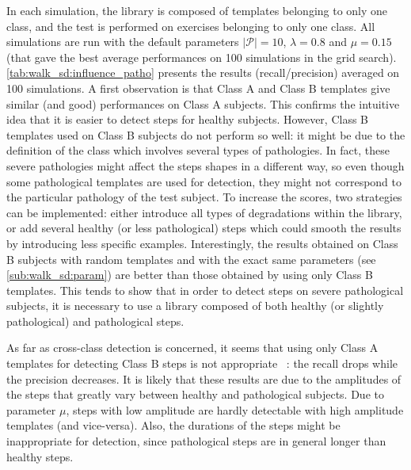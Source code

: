 \documentclass[../thesis.tex]{subfiles}
\begin{document}
In each simulation, the library is composed of templates belonging to only one class, and the test is performed on exercises belonging to only one class. All simulations are run with the default parameters  $|\mathcal{P}|=10$, $\lambda=0.8$ and $\mu=0.15$ (that gave the best average performances on 100 simulations in the grid search).  \autoref{tab:walk_sd:influence_patho} presents the results (recall/precision) averaged on 100 simulations.
A first observation is that Class A and Class B templates give similar (and good) performances on Class A subjects. This confirms the intuitive idea that it is easier to detect steps for healthy subjects. However, Class B templates used on Class B subjects do not perform so well: it might be due to the definition of the class which involves several types of pathologies. In fact, these severe pathologies might affect the steps shapes in a different way, so even though some pathological templates are used for detection, they might not correspond to the particular pathology of the test subject. To increase the scores, two strategies can be implemented: either introduce all types of degradations within the library, or add several healthy (or less pathological) steps which could smooth the results by introducing less specific examples. Interestingly, the results obtained on Class B subjects with random templates and with the exact same parameters (see \autoref{sub:walk_sd:param})
 are better than those 
obtained by using only Class B templates. This tends to show that in order to detect steps on severe pathological subjects, it is necessary to use a library composed of both healthy (or slightly pathological) and pathological steps.

As far as cross-class detection is concerned, it seems that using only Class A templates for detecting Class B steps is not appropriate~ : the recall drops  while the precision  decreases. It is likely that these results are due to the amplitudes of the steps that greatly vary between healthy and pathological subjects. Due to parameter $\mu$, steps with low amplitude are hardly detectable with high amplitude templates (and vice-versa). Also, the durations of the steps might be inappropriate for detection, since pathological steps are in general longer than healthy steps.
\end{document}
